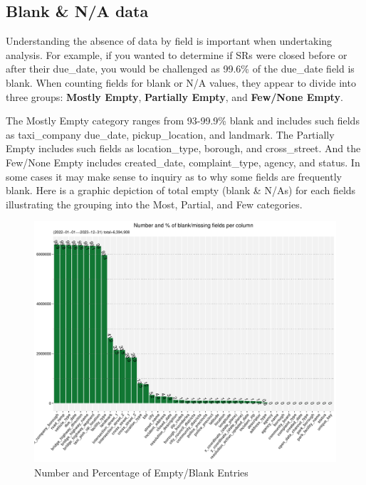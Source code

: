 \documentclass[12pt, titlepage]{article}
\begin{document}
		
\subsection{Blank \& N/A data}
\label{sec:blanks}
Understanding the absence of data by field is important 
when undertaking analysis. For example, if you wanted to 
determine if SRs were closed before or after their due\_date, 
you would be challenged as 99.6\% of the due\_date field is 
blank. When counting fields for blank or N/A values, they appear 
to divide into three groups: \textbf{Mostly Empty}, \textbf{Partially Empty}, 
and \textbf{Few/None Empty}. 

The Mostly Empty category ranges from 93-99.9\% blank 
and includes such fields as taxi\_company due\_date, pickup\_location, and 
landmark. The Partially Empty includes such fields as location\_type, borough, 
and cross\_street. And the Few/None Empty includes created\_date, 
complaint\_type, agency, and status. In some cases it may make 
sense to inquiry as to why some fields are frequently blank. Here is a graphic 
depiction of total empty (blank \& N/As) for each fields illustrating
the grouping into the Most, Partial, and Few categories. 


\begin{figure}[tbp]
	\centering
  	\includegraphics[width=\textwidth]{BlankFields.pdf}
	\caption{Number and Percentage of Empty/Blank Entries}
	\label{fig:blank_fields}
\end{figure}
\end{document}
